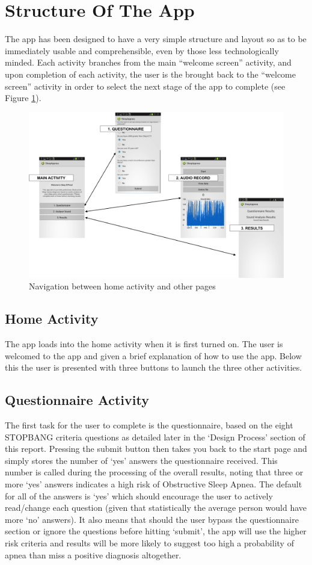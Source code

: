 \section{Structure Of The App}
The app has been designed to have a very simple structure and layout so as to be immediately usable and comprehensible, even by those less technologically minded. Each activity branches from the main “welcome screen” activity, and upon completion of each activity, the user is the brought back to the “welcome screen” activity in order to select the next stage of the app to complete (see Figure \ref{fig:appStructure}).
\begin{figure}[ht]
		\centering
			\includegraphics[width=.9\textwidth]{drawings/App_nav.png}
		\caption{Navigation between home activity and other pages}
		\label{fig:appStructure}
	\end{figure}
\subsection{Home Activity}
The app loads into the home activity when it is first turned on. The user is welcomed to the app and given a brief explanation of how to use the app. Below this the user is presented with three buttons to launch the three other activities. 
\subsection{Questionnaire Activity}
The first task for the user to complete is the questionnaire, based on the eight STOPBANG criteria questions as detailed later in the ‘Design Process’ section of this report. Pressing the submit button then takes you back to the start page and simply stores the number of ‘yes’ answers the questionnaire received. This number is called during the processing of the overall results, noting that three or more ‘yes’ answers indicates a high risk of Obstructive Sleep Apnea. The default for all of the answers is ‘yes’ which should encourage the user to actively read/change each question (given that statistically the average person would have more ‘no’ answers). It also means that should the user bypass the questionnaire section or ignore the questions before hitting ‘submit’, the app will use the higher risk criteria and results will be more likely to suggest too high a probability of apnea than miss a positive diagnosis altogether. 
